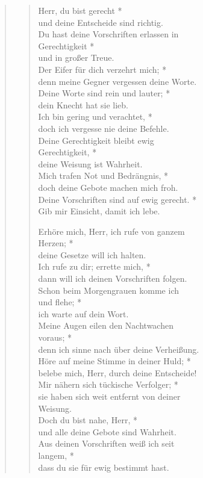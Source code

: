 \begin{quote}
\begin{verse}
 Herr, du bist gerecht *\\
und deine Entscheide sind richtig.\\ \vin
 Du hast deine Vorschriften erlassen in \\ \vin Gerechtigkeit *\\ \vin
und in großer Treue.\\
 Der Eifer für dich verzehrt mich; *\\
denn meine Gegner vergessen deine Worte.\\  \vin
 Deine Worte sind rein und lauter; *\\ \vin
dein Knecht hat sie lieb.\\ 
Ich bin gering und verachtet, *\\
doch ich vergesse nie deine Befehle.\\ \vin
Deine Gerechtigkeit bleibt ewig \\ \vin Gerechtigkeit, *\\ \vin
deine Weisung ist Wahrheit.\\
Mich trafen Not und Bedrängnis, *\\
doch deine Gebote machen mich froh.\\ \vin
Deine Vorschriften sind auf ewig gerecht. *\\ \vin
Gib mir Einsicht, damit ich lebe.\\  

\vspace{0.4cm}

Erhöre mich, Herr, ich rufe von ganzem \\Herzen; *\\
deine Gesetze will ich halten.\\ \vin
Ich rufe zu dir; errette mich, *\\ \vin
dann will ich deinen Vorschriften folgen.\\
Schon beim Morgengrauen komme ich\\ und flehe; *\\
ich warte auf dein Wort.\\ \vin
Meine Augen eilen den Nachtwachen \\ \vin voraus; *\\ \vin
denn ich sinne nach über deine Verheißung.\\ 
Höre auf meine Stimme in deiner Huld; *\\
belebe mich, Herr, durch deine Entscheide!\\ \vin
Mir nähern sich tückische Verfolger; *\\ \vin
sie haben sich weit entfernt von deiner\\ \vin Weisung.\\
Doch du bist nahe, Herr, *\\
und alle deine Gebote sind Wahrheit.\\ \vin
Aus deinen Vorschriften weiß ich seit \\ \vin langem, *\\ \vin
dass du sie für ewig bestimmt hast.\\                         
\end{verse}

\end{quote}

